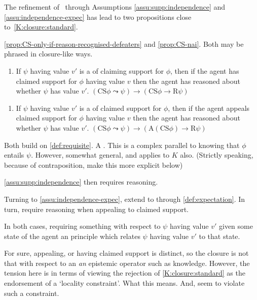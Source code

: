 \begin{note}[Link]
  The refinement of~\ideaCSB{} through Assumptions \ref{assu:supp:independence} and \ref{assu:independence-expec} has lead to two propositions close to~\ref{K:closure:standard}.

  \autoref{prop:CS-only-if-reason-recognised-defeaters} and \autoref{prop:CS-nai}.
  Both may be phrased in closure-like ways.

  \begin{enumerate}[label=P\ref{prop:CS-only-if-reason-recognised-defeaters}\('\).]
  \item If \(\psi\) having value \(v'\) is a \requ{} of claiming support for \(\phi\), then if the agent has claimed support for \(\phi\) having value \(v\) then the agent has reasoned about whether \(\psi\) has value \(v'\).\newline
    \mbox{}\hfill \((\text{CS}\phi \leadsto \psi) \rightarrow (\text{CS}\phi \rightarrow \text{R}\psi)\)
  \end{enumerate}

  \begin{enumerate}[label=P\ref{prop:CS-nai}\('\).]
  \item If \(\psi\) having value \(v'\) is a \expec{} of claimed support for \(\phi\), then if the agent appeals claimed support for \(\phi\) having value \(v\) then the agent has reasoned about whether \(\psi\) has value \(v'\).\newline
    \mbox{}\hfill \((\text{CS}\phi \leadsto \psi) \rightarrow (\text{A}(\text{CS}\phi) \rightarrow \text{R}\psi)\)
  \end{enumerate}

  Both build on \autoref{def:requisite}.
  A \requ{}.
  This is a complex parallel to knowing that \(\phi\) entails \(\psi\).
  However, somewhat general, and applies to \(K\) also.
  {\color{red} (Strictly speaking, because of contraposition, make this more explicit below)}

  \autoref{assu:supp:independence} then requires reasoning.

  Turning to \ref{assu:independence-expec}, extend \requ{} to \expec{} through \autoref{def:expectation}.
  In turn, require reasoning when appealing to claimed support.

  In both cases, requiring something with respect to \(\psi\) having value \(v'\) given some state of the agent an principle which relates \(\psi\) having value \(v'\) to that state.

  For sure, appealing, or having claimed support is distinct, so the closure is not that with respect to an \emph{an} epistemic operator such as knowledge.
  However, the tension here is in terms of viewing the rejection of \ref{K:closure:standard} as the endorsement of a `locality constraint'.
  {\color{red} What this means.}
  And, seem to violate such a constraint.
\end{note}

